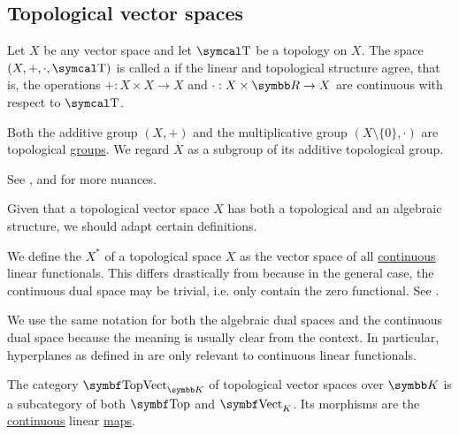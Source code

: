 \subsection{Topological vector spaces}\label{subsec:topological_vector_spaces}

\begin{definition}\label{def:topological_vector_space}
  Let \( X \) be any vector space and let \( \CT \) be a topology on \( X \). The space \( (X, +, \cdot, \CT) \) is called a  if the linear and topological structure agree, that is, the operations \( +: X \times X \to X \) and \( \cdot: X \times \BR \to X \) are continuous with respect to \( \CT \).

  Both the additive group \( (X, +) \) and the multiplicative group \( (X \setminus \{ 0 \}, \cdot) \) are topological \hyperref[def:topological_group]{groups}. We regard \( X \) as a subgroup of its additive topological group.

  See ,  and  for more nuances.
\end{definition}

Given that a topological vector space \( X \) has both a topological and an algebraic structure, we should adapt certain definitions.

\begin{definition}\label{def:continuous_dual_space}
  We define the  \( X^* \) of a topological space \( X \) as the vector space of all \hyperref[def:global_continuity]{continuous} linear functionals. This differs drastically from  because in the general case, the continuous dual space may be trivial, i.e. only contain the zero functional. See .

  We use the same notation for both the algebraic dual spaces and the continuous dual space because the meaning is usually clear from the context. In particular, hyperplanes as defined in  are only relevant to continuous linear functionals.
\end{definition}

\begin{definition}\label{def:category_of_topological_vector_spaces}
  The category \( \Cat{TopVect}_{\BK} \) of topological vector spaces over \( \BK \) is a subcategory of both \( \Cat{Top} \) and \( \Cat{Vect}_K \). Its morphisms are the \hyperref[def:global_continuity]{continuous} linear \hyperref[def:linear_operator]{maps}.
\end{definition}

